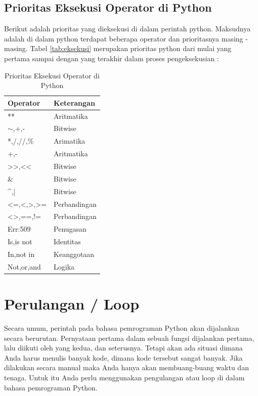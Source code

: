 \subsection{Prioritas Eksekusi Operator di Python}
Berikut adalah prioritas yang dieksekusi di dalam perintah python. Maksudnya adalah di dalam python terdapat beberapa operator dan prioritasnya masing - masing. Tabel \ref{tab:eksekusi} merupakan prioritas python dari mulai yang pertama sampai dengan yang terakhir dalam proses pengeksekusian :
\begin{table}[]
\caption{Prioritas Eksekusi Operator di Python}
\label{tab:my-table}
\begin{tabular}{|l|l|}
\hline
Operator                                                & Keterangan   \\ \hline
**                                                      & Aritmatika   \\ \hline
$\sim$,+,-                                              & Bitwise      \\ \hline
*,/,//,\%                                               & Arimatika    \\ \hline
+,-                                                     & Aritmatika   \\ \hline
\textgreater{}\textgreater{},\textless{}\textless{}     & Bitwise      \\ \hline
\&                                                      & Bitwise      \\ \hline
\textasciicircum{},|                                    & Bitwise      \\ \hline
\textless{}=,\textless{},\textgreater{},\textgreater{}= & Perbandingan \\ \hline
\textless{}\textgreater{},==,!=                         & Perbandingan \\ \hline
Err:509                                                 & Penugasan    \\ \hline
Is,is not                                               & Identitas    \\ \hline
In,not in                                               & Keanggotaan  \\ \hline
Not,or,and                                              & Logika       \\ \hline
\end{tabular}
\end{table}

\section{Perulangan / Loop}
Secara umum, perintah pada bahasa pemrograman Python akan dijalankan secara berurutan. Pernyataan pertama dalam sebuah fungsi dijalankan pertama, lalu diikuti oleh yang kedua, dan seterusnya. Tetapi akan ada situasi dimana Anda harus menulis banyak kode, dimana kode tersebut sangat banyak. Jika dilakukan secara manual maka Anda hanya akan membuang-buang waktu dan tenaga. Untuk itu Anda perlu menggunakan pengulangan atau loop di dalam bahasa pemrograman Python.

